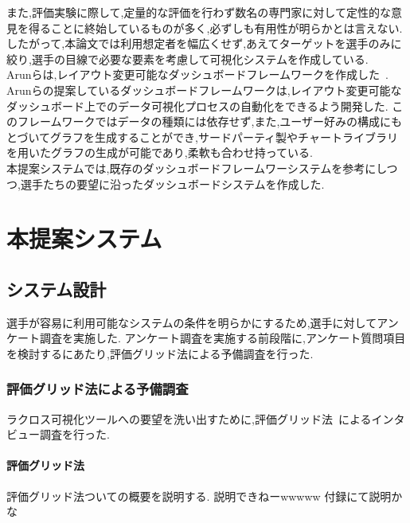 \documentclass[sotsuron]{kuee}
\begin{document}
	また,評価実験に際して,定量的な評価を行わず数名の専門家に対して定性的な意見を得ることに終始しているものが多く,必ずしも有用性が明らかとは言えない.
	\\したがって,本論文では利用想定者を幅広くせず,あえてターゲットを選手のみに絞り,選手の目線で必要な要素を考慮して可視化システムを作成している.
	\\Arunらは,レイアウト変更可能なダッシュボードフレームワークを作成した~\cite{dashboard}.
	Arunらの提案しているダッシュボードフレームワークは,レイアウト変更可能なダッシュボード上でのデータ可視化プロセスの自動化をできるよう開発した.
	このフレームワークではデータの種類には依存せず,また,ユーザー好みの構成にもとづいてグラフを生成することができ,サードパーティ製やチャートライブラリを用いたグラフの生成が可能であり,柔軟も合わせ持っている.
	\\本提案システムでは,既存のダッシュボードフレームワーシステムを参考にしつつ,選手たちの要望に沿ったダッシュボードシステムを作成した.

\chapter{本提案システム}
	\section{システム設計}
		選手が容易に利用可能なシステムの条件を明らかにするため,選手に対してアンケート調査を実施した.
		アンケート調査を実施する前段階に,アンケート質問項目を検討するにあたり,評価グリッド法による予備調査を行った.
		\subsection{評価グリッド法による予備調査}
			ラクロス可視化ツールへの要望を洗い出すために,評価グリッド法~\cite{EGM}によるインタビュー調査を行った.
			\subsubsection{評価グリッド法}
				評価グリッド法ついての概要を説明する.
				説明できねーwwwww
				付録にて説明かな
\end{document}
